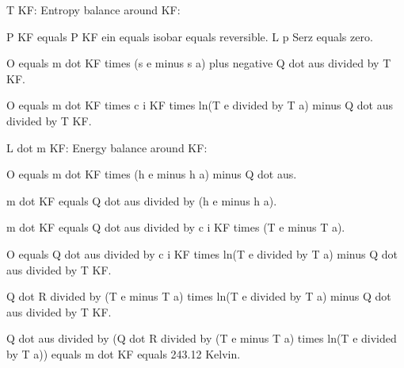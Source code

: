 T KF: Entropy balance around KF:  

P KF equals P KF ein equals isobar equals reversible.  
L p Serz equals zero.  

O equals m dot KF times (s e minus s a) plus negative Q dot aus divided by T KF.  

O equals m dot KF times c i KF times ln(T e divided by T a) minus Q dot aus divided by T KF.  

L dot m KF: Energy balance around KF:  

O equals m dot KF times (h e minus h a) minus Q dot aus.  

m dot KF equals Q dot aus divided by (h e minus h a).  

m dot KF equals Q dot aus divided by c i KF times (T e minus T a).  

O equals Q dot aus divided by c i KF times ln(T e divided by T a) minus Q dot aus divided by T KF.  

Q dot R divided by (T e minus T a) times ln(T e divided by T a) minus Q dot aus divided by T KF.  

Q dot aus divided by (Q dot R divided by (T e minus T a) times ln(T e divided by T a)) equals m dot KF equals 243.12 Kelvin.